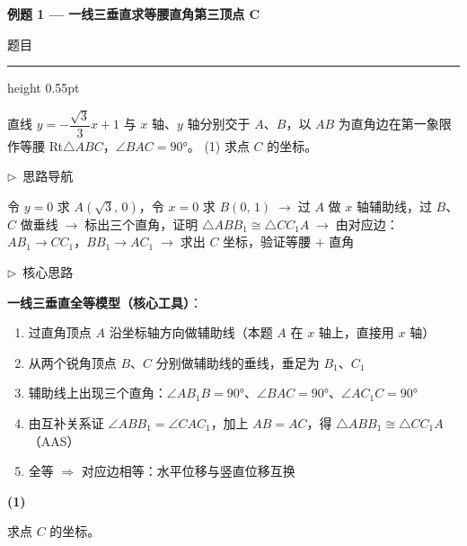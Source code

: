 \documentclass{exam-zh}
\newcommand{\edukai}{\kaishu}
\newcommand{\eduSectionTitle}[1]{%
  \needspace{5\baselineskip}%
  \vspace{2mm}
  {\color{edu-blue}\bfseries\large #1}\par
  \vspace{3mm}
}
\newenvironment{eduSubQuestionItem}[1]{%
  \needspace{4\baselineskip}%
  \vspace{2mm}
  \par\noindent
  \hangindent=8mm\hangafter=1
  {\color{edu-blue}\bfseries #1}\enspace
  \begingroup
  \color{edu-ink}
}{%
  \endgroup
  \par
  \vspace{3mm}
}
\newenvironment{eduAuxItem}[1]{%
  \needspace{4\baselineskip}%
  \vspace{2mm}
  \par\noindent
  \hangindent=8mm\hangafter=1
  {\color{edu-blue}\edukai $\triangleright$~#1}\enspace
  \begingroup
  \color{edu-ink}
  \edukai
}{%
  \endgroup
  \par
  \vspace{4mm}
}
\newenvironment{eduProblemBlock}[1][题目]{%
  \needspace{8\baselineskip}
  {\small\color{edu-muted}#1}\par
  \vspace{1.5mm}
  {\color{edu-blue}\hrule height 0.55pt}
  \vspace{4.5mm}
  \begingroup
  \color{edu-ink}
  \large
  \setlength{\parskip}{2.2mm}
  \linespread{1.20}\selectfont
}{%
  \par
  \endgroup
  \vspace{6mm}
}
\begin{document}
\eduSectionTitle{例题 1 — 一线三垂直求等腰直角第三顶点 C}

\begin{eduProblemBlock}[题目]
直线 $y = -\dfrac{\sqrt{3}}{3}x + 1$ 与 $x$ 轴、$y$ 轴分别交于 $A$、$B$，以 $AB$ 为直角边在第一象限作等腰 Rt$\triangle ABC$，$\angle BAC = 90°$。
(1) 求点 $C$ 的坐标。

\end{eduProblemBlock}









\begin{eduAuxItem}{思路导航}
令 $y=0$ 求 $A(\sqrt{3},\,0)$，令 $x=0$ 求 $B(0,\,1)$$\;\to\;$过 $A$ 做 $x$ 轴辅助线，过 $B$、$C$ 做垂线$\;\to\;$标出三个直角，证明 $\triangle ABB_1 \cong \triangle CC_1A$$\;\to\;$由对应边：$AB_1 \to CC_1$，$BB_1 \to AC_1$$\;\to\;$求出 $C$ 坐标，验证等腰 $+$ 直角\end{eduAuxItem}




\begin{eduAuxItem}{核心思路}
\textbf{一线三垂直全等模型（核心工具）}：
\begin{enumerate}
  \item 过直角顶点 $A$ 沿坐标轴方向做辅助线（本题 $A$ 在 $x$ 轴上，直接用 $x$ 轴）
  \item 从两个锐角顶点 $B$、$C$ 分别做辅助线的垂线，垂足为 $B_1$、$C_1$
  \item 辅助线上出现三个直角：$\angle AB_1B = 90°$、$\angle BAC = 90°$、$\angle AC_1C = 90°$
  \item 由互补关系证 $\angle ABB_1 = \angle CAC_1$，加上 $AB = AC$，得 $\triangle ABB_1 \cong \triangle CC_1A$（AAS）
  \item 全等 $\Rightarrow$ 对应边相等：水平位移与竖直位移互换
\end{enumerate}
\end{eduAuxItem}




\begin{eduSubQuestionItem}{(1)}
求点 $C$ 的坐标。\end{eduSubQuestionItem}
\end{document}
